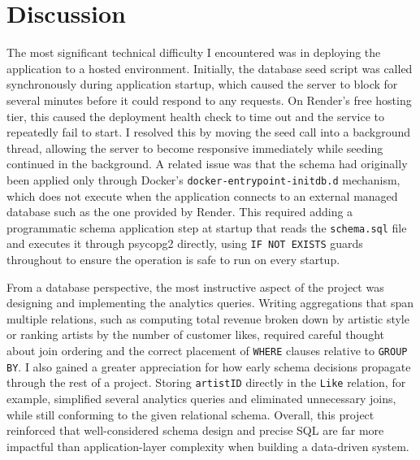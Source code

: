 \documentclass[12pt]{article}
\begin{document}
\newpage

\section*{Discussion}

The most significant technical difficulty I encountered was in deploying the application to a hosted environment. Initially, the database seed script was called synchronously during application startup, which caused the server to block for several minutes before it could respond to any requests. On Render's free hosting tier, this caused the deployment health check to time out and the service to repeatedly fail to start. I resolved this by moving the seed call into a background thread, allowing the server to become responsive immediately while seeding continued in the background. A related issue was that the schema had originally been applied only through Docker's \texttt{docker-entrypoint-initdb.d} mechanism, which does not execute when the application connects to an external managed database such as the one provided by Render. This required adding a programmatic schema application step at startup that reads the \texttt{schema.sql} file and executes it through psycopg2 directly, using \texttt{IF NOT EXISTS} guards throughout to ensure the operation is safe to run on every startup.

From a database perspective, the most instructive aspect of the project was designing and implementing the analytics queries. Writing aggregations that span multiple relations, such as computing total revenue broken down by artistic style or ranking artists by the number of customer likes, required careful thought about join ordering and the correct placement of \texttt{WHERE} clauses relative to \texttt{GROUP BY}. I also gained a greater appreciation for how early schema decisions propagate through the rest of a project. Storing \texttt{artistID} directly in the \texttt{Like} relation, for example, simplified several analytics queries and eliminated unnecessary joins, while still conforming to the given relational schema. Overall, this project reinforced that well-considered schema design and precise SQL are far more impactful than application-layer complexity when building a data-driven system.
\end{document}
